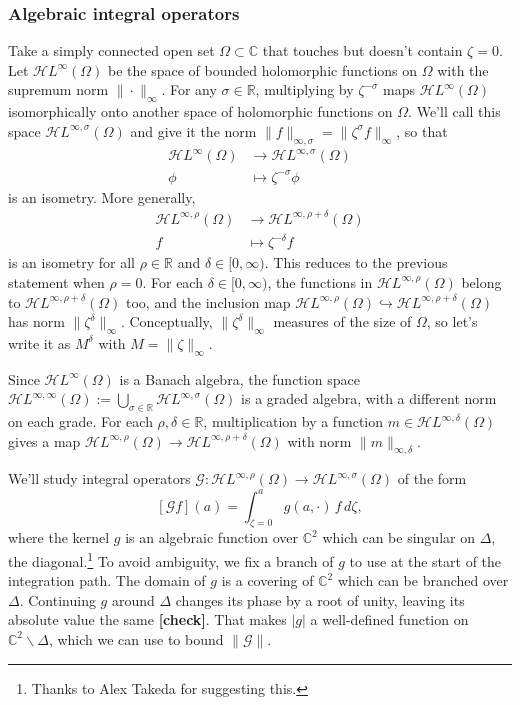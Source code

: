 \documentclass{article}
\theoremstyle{plain}
\newcommand{\maps}{\colon}
\newcommand{\R}{\mathbb{R}}
\newcommand{\C}{\mathbb{C}}
\newcommand{\holoL}[1]{\mathcal{H}L^{#1}} %
\begin{document}
\color{DarkBlue}
\subsubsection{Algebraic integral operators}
Take a simply connected open set $\Omega \subset \C$ that touches but doesn't contain $\zeta = 0$. Let $\holoL{\infty}(\Omega)$ be the space of bounded holomorphic functions on $\Omega$ with the supremum norm $\|\cdot\|_\infty$. For any $\sigma \in \R$, multiplying by $\zeta^{-\sigma}$ maps $\holoL{\infty}(\Omega)$ isomorphically onto another space of holomorphic functions on $\Omega$. We'll call this space $\holoL{\infty, \sigma}(\Omega)$ and give it the norm $\|f\|_{\infty, \sigma} = \|\zeta^\sigma f\|_\infty$, so that
\begin{align*}
\holoL{\infty}(\Omega) & \to \holoL{\infty, \sigma}(\Omega) \\
\phi & \mapsto \zeta^{-\sigma} \phi
\end{align*}
is an isometry. More generally,
\begin{align*}
\holoL{\infty, \rho}(\Omega) & \to \holoL{\infty, \rho+\delta}(\Omega) \\
f & \mapsto \zeta^{-\delta} f
\end{align*}
is an isometry for all $\rho \in \R$ and $\delta \in [0, \infty)$. This reduces to the previous statement when $\rho = 0$. For each $\delta \in [0, \infty)$, the functions in $\holoL{\infty, \rho}(\Omega)$ belong to $\holoL{\infty, \rho+\delta}(\Omega)$ too, and the inclusion map $\holoL{\infty, \rho}(\Omega) \hookrightarrow \holoL{\infty, \rho+\delta}(\Omega)$ has norm $\|\zeta^\delta\|_\infty$. Conceptually, $\|\zeta^\delta\|_\infty$ measures of the size of $\Omega$, so let's write it as $M^\delta$ with $M = \|\zeta\|_\infty$.

Since $\holoL{\infty}(\Omega)$ is a Banach algebra, the function space $\holoL{\infty, \infty}(\Omega) := \bigcup_{\sigma \in \R} \holoL{\infty, \sigma}(\Omega)$ is a graded algebra, with a different norm on each grade. For each $\rho, \delta \in \R$, multiplication by a function $m \in \holoL{\infty, \delta}(\Omega)$ gives a map $\holoL{\infty, \rho}(\Omega) \to \holoL{\infty, \rho+\delta}(\Omega)$ with norm $\|m\|_{\infty, \delta}$.

We'll study integral operators $\mathcal{G} \maps \holoL{\infty, \rho}(\Omega) \to \holoL{\infty, \sigma}(\Omega)$ of the form
\[ [\mathcal{G}f](a) = \int_{\zeta = 0}^{a} g(a, \cdot)\,f\,d\zeta, \]
where the kernel $g$ is an algebraic function over $\C^2$ which can be singular on $\Delta$, the diagonal.\footnote{Thanks to Alex Takeda for suggesting this.} To avoid ambiguity, we fix a branch of $g$ to use at the start of the integration path. The domain of $g$ is a covering of $\C^2$ which can be branched over $\Delta$. Continuing $g$ around $\Delta$ changes its phase by a root of unity, leaving its absolute value the same \textbf{[check]}. That makes $|g|$ a well-defined function on $\C^2 \smallsetminus \Delta$, which we can use to bound $\|\mathcal{G}\|$.
\end{document}
